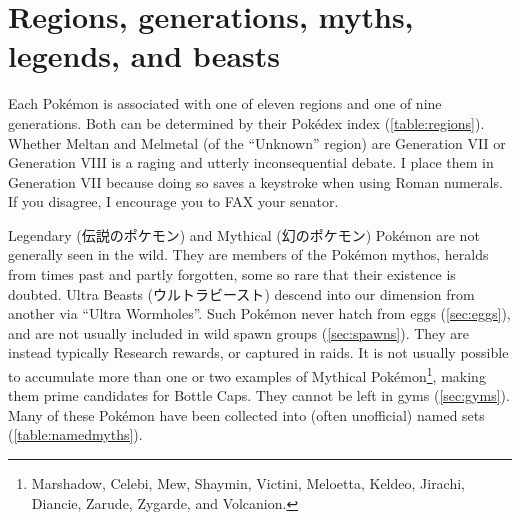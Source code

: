 \section{Regions, generations, myths, legends, and beasts\label{sec:regions}}
Each Pokémon is associated with one of eleven regions and one of nine generations.
Both can be determined by their Pokédex index (\autoref{table:regions}).
Whether Meltan and Melmetal (of the ``Unknown'' region) are Generation VII
  or Generation VIII is a raging and utterly inconsequential debate.
I place them in Generation VII because doing so saves a keystroke when using Roman numerals.
If you disagree, I encourage you to FAX your senator.

Legendary (\textjapanese{伝説のポケモン}) and Mythical (\textjapanese{幻のポケモン}) Pokémon
 are not generally seen in the wild.
They are members of the Pokémon mythos, heralds from times past and partly forgotten,
  some so rare that their existence is doubted.
Ultra Beasts (\textjapanese{ウルトラビースト}) descend into our dimension from
  another via ``Ultra Wormholes''.
Such Pokémon never hatch from eggs (\autoref{sec:eggs}), and are not usually included in wild spawn groups (\autoref{sec:spawns}).
They are instead typically Research rewards, or captured in raids.
It is not usually possible to accumulate more than one or two examples of Mythical
  Pokémon\footnote{Marshadow, Celebi, Mew, Shaymin, Victini, Meloetta, Keldeo,
  Jirachi, Diancie, Zarude, Zygarde, and Volcanion.}, making them prime
  candidates for Bottle Caps.
They cannot be left in gyms (\autoref{sec:gyms}).
Many of these Pokémon have been collected into (often unofficial) named sets (\autoref{table:namedmyths}).


